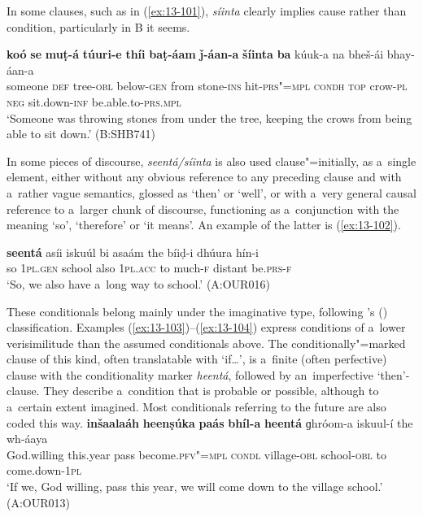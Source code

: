 In some clauses, such as in (\ref{ex:13-101}), \textit{síinta} clearly implies cause rather than condition, particularly in B it seems.

\begin{exe}
\ex
\label{ex:13-101}
\gll \textbf{koó} \textbf{se} \textbf{muṭ-á} \textbf{túuri-e} \textbf{thíi} \textbf{baṭ-áam} \textbf{ǰ-áan-a} \textbf{šíinta} \textbf{ba} kúuk-a
na bheš-ái  bhay-áan-a \\
someone \textsc{def} tree-\textsc{obl} below-\textsc{gen} from stone-\textsc{ins}  hit-\textsc{prs"=mpl} \textsc{condh} \textsc{top} crow-\textsc{pl} \textsc{neg} sit.down-\textsc{inf} be.able.to-\textsc{prs.mpl} \\
\glt `Someone was throwing stones from under the tree, keeping the crows from being able to sit down.' (B:SHB741) 
\end{exe}

In some pieces of discourse, \textit{seentá/síinta} is also used clause"=initially, as a~single element, either without any obvious reference to any preceding clause and with a~rather vague semantics, glossed as `then' or `well', or with a~very general causal reference to a~larger chunk of discourse, functioning as a~conjunction with the meaning `so', `therefore' or `it means'. An example of the latter is (\ref{ex:13-102}).

\begin{exe}
\ex
\label{ex:13-102}
\gll \textbf{seentá} asíi iskuúl bi asaám the bíiḍ-i dhúura  hín-i \\
so \textsc{1pl.gen} school also \textsc{1pl.acc} to much-\textsc{f} distant be.\textsc{prs-f} \\
\glt `So, we also have a~long way to school.' (A:OUR016) 
\end{exe}

 These conditionals belong mainly under the imaginative type, following \citeauthor{thompsonetal2007}'s (\citeyear[259--260]{thompsonetal2007}) classification. Examples (\ref{ex:13-103})--(\ref{ex:13-104}) express conditions of a~lower verisimilitude than the assumed conditionals above. The conditionally"=marked clause of this kind, often translatable with `if{\ldots}', is a~finite (often perfective) clause with the conditionality marker \textit{heentá}, followed by an~imperfective `then'-clause. They describe a~condition that is probable or possible, although to a~certain extent imagined. Most conditionals referring to the future are also coded this way.
\ea
\label{ex:13-103}
\gll \textbf{inšaalaáh} \textbf{heenṣúka} \textbf{paás} \textbf{bhíl-a} \textbf{heentá} ɡhróom-a iskuul-í the wh-áaya\\
God.willing this.year pass become.\textsc{pfv"=mpl} \textsc{condl} village-\textsc{obl} school-\textsc{obl} to come.down-\textsc{1pl}\\
\glt `If we, God willing, pass this year, we will come down to the village school.' (A:OUR013)

